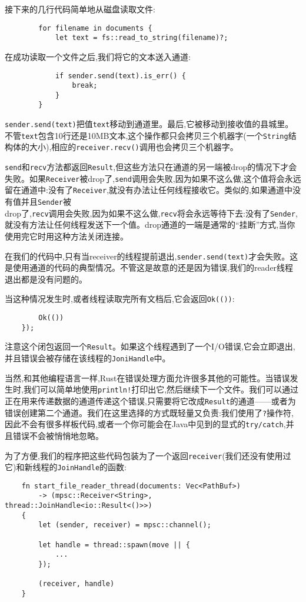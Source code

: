 接下来的几行代码简单地从磁盘读取文件:
\begin{verbatim}
        for filename in documents {
            let text = fs::read_to_string(filename)?;
\end{verbatim}

在成功读取一个文件之后,我们将它的文本送入通道:
\begin{verbatim}
            if sender.send(text).is_err() {
                break;
            }
        }
\end{verbatim}

\texttt{sender.send(text)}把值\texttt{text}移动到通道里。最后,它被移动到接收值的县城里。不管\texttt{text}包含10行还是10MB文本,这个操作都只会拷贝三个机器字(一个\texttt{String}结构体的大小),相应的\texttt{receiver.recv()}调用也会拷贝三个机器字。

\texttt{send}和\texttt{recv}方法都返回\texttt{Result},但这些方法只在通道的另一端被drop的情况下才会失败。如果\texttt{Receiver}被drop了,\texttt{send}调用会失败,因为如果不这么做,这个值将会永远留在通道中:没有了\texttt{Receiver},就没有办法让任何线程接收它。类似的,如果通道中没有值并且\texttt{Sender}被\\
drop了,\texttt{recv}调用会失败,因为如果不这么做,\texttt{recv}将会永远等待下去:没有了\texttt{Sender},就没有方法让任何线程发送下一个值。drop通道的一端是通常的“挂断”方式,当你使用完它时用这种方法关闭连接。

在我们的代码中,只有当receiver的线程提前退出,\texttt{sender.send(text)}才会失败。这是使用通道的代码的典型情况。不管这是故意的还是因为错误,我们的reader线程退出都是没有问题的。

当这种情况发生时,或者线程读取完所有文档后,它会返回\texttt{Ok(())}:
\begin{verbatim}
        Ok(())
    });
\end{verbatim}

注意这个闭包返回一个\texttt{Result}。如果这个线程遇到了一个I/O错误,它会立即退出,并且错误会被存储在该线程的\texttt{JoniHandle}中。

当然,和其他编程语言一样,Rust在错误处理方面允许很多其他的可能性。当错误发生时,我们可以简单地使用\texttt{println!}打印出它,然后继续下一个文件。我们可以通过正在用来传递数据的通道传递这个错误,只需要将它改成\texttt{Result}的通道——或者为错误创建第二个通道。我们在这里选择的方式既轻量又负责:我们使用了\texttt{?}操作符,因此不会有很多样板代码,或者一个你可能会在Java中见到的显式的\texttt{try/catch},并且错误不会被悄悄地忽略。

为了方便,我们的程序把这些代码包装为了一个返回\texttt{receiver}(我们还没有使用过它)和新线程的\texttt{JoinHandle}的函数:
\begin{verbatim}
    fn start_file_reader_thread(documents: Vec<PathBuf>)
        -> (mpsc::Receiver<String>, thread::JoinHandle<io::Result<()>>)
    {
        let (sender, receiver) = mpsc::channel();

        let handle = thread::spawn(move || {
            ...
        });

        (receiver, handle)
    }
\end{verbatim}

